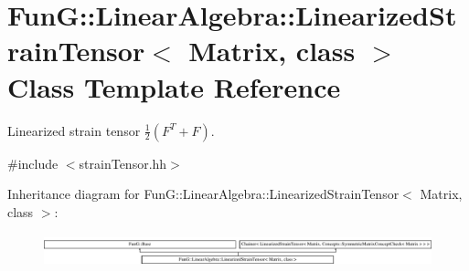\hypertarget{classFunG_1_1LinearAlgebra_1_1LinearizedStrainTensor}{\section{Fun\-G\-:\-:Linear\-Algebra\-:\-:Linearized\-Strain\-Tensor$<$ Matrix, class $>$ Class Template Reference}
\label{classFunG_1_1LinearAlgebra_1_1LinearizedStrainTensor}
}


Linearized strain tensor $ \frac{1}{2}\left(F^T+F\right) $.  




{\ttfamily \#include $<$strain\-Tensor.\-hh$>$}

Inheritance diagram for Fun\-G\-:\-:Linear\-Algebra\-:\-:Linearized\-Strain\-Tensor$<$ Matrix, class $>$\-:\begin{figure}[H]
\begin{center}
\leavevmode
\includegraphics[height=0.962199cm]{classFunG_1_1LinearAlgebra_1_1LinearizedStrainTensor}
\end{center}
\end{figure}
